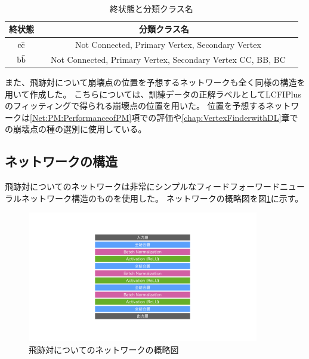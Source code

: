 \begin{table}[htb]
 \centering
　\small
  \begin{tabular}{c c l} \hline
     終状態 & 分類クラス名\\ \hline \hline
    $\rm c\bar{c}$ &　Not Connected, Primary Vertex, Secondary Vertex \\ \hline
    $\rm b\bar{b}$ &　Not Connected, Primary Vertex, Secondary Vertex CC, BB, BC \\ \hline
  \end{tabular}
  \caption{終状態と分類クラス名}
  \label{FinalStateandClassName}
\end{table}

また、飛跡対について崩壊点の位置を予想するネットワークも全く同様の構造を用いて作成した。
こちらについては、訓練データの正解ラベルとしてLCFIPlusのフィッティングで得られる崩壊点の位置を用いた。
位置を予想するネットワークは\ref{Net:PM:PerformanceofPM}項での評価や\ref{chap:VertexFinderwithDL}章での崩壊点の種の選別に使用している。


\subsection{ネットワークの構造} \label{Net:PM:StructureofPM}

飛跡対についてのネットワークは非常にシンプルなフィードフォーワードニューラルネットワーク構造のものを使用した。
ネットワークの概略図を図\ref{3-3-1-1PairModel}に示す。

\begin{figure}[h]
 \centering
 \includegraphics[trim = 100 100 100 50, width=0.9\textwidth]{Figure/3Networks/3-3-1-1PairModel.png}
 \caption{飛跡対についてのネットワークの概略図}
 \label{3-3-1-1PairModel}
\end{figure}

